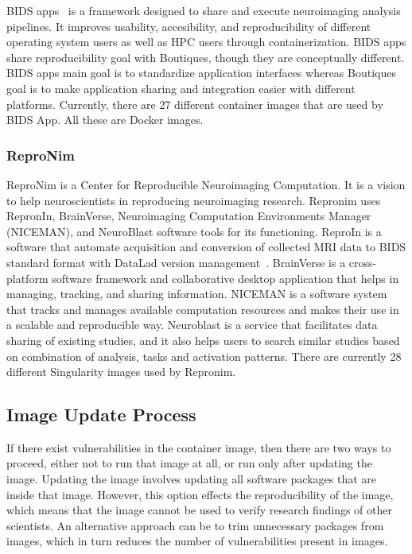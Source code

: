 \documentclass[a4paper,num-refs]{oup-contemporary}
\begin{document}
BIDS apps~\cite{gorgolewski2017bids} is a framework designed to share and execute neuroimaging
analysis pipelines. It improves usability, accesibility, and reproducibility
of different operating system users as well as HPC users through containerization.
BIDS apps share reproducibility goal with Boutiques, though they are conceptually different.
BIDS apps main goal is to standardize application interfaces whereas Boutiques goal is to
make application sharing and integration easier with different platforms.
Currently, there are 27 different container images that are used by
BIDS App. All these are Docker images.

\subsubsection{ReproNim}

ReproNim is a Center for Reproducible Neuroimaging Computation. It is a vision
to help neuroscientists in reproducing neuroimaging research. Repronim
uses RepronIn, BrainVerse, Neuroimaging Computation Environments Manager (NICEMAN),
and NeuroBlast software tools for its
functioning. ReproIn is a software that automate acquisition and conversion
of collected MRI data to BIDS standard format with DataLad version management~\cite{kennedy2019everything}.
BrainVerse is a cross-platform software framework and collaborative desktop application
that helps in managing, tracking, and sharing information.
NICEMAN is a software system that tracks and manages available computation resources
and makes their use in a scalable and reproducible way.
Neuroblast is a service that facilitates data sharing of existing studies, and it also
helps users to search similar studies based on combination of analysis,
tasks and activation patterns. There are currently 28 different Singularity
images used by Repronim. 

\subsection{Image Update Process}

If there exist vulnerabilities in the container image, then there are two ways
to proceed, either not to run that image at all, or run only after updating the
image. Updating the image involves updating all software packages that are
inside that image. However, this option effects the reproducibility
of the image, which means that the image cannot be used to verify research
findings of other scientists. An alternative approach can be to trim unnecessary
packages from images, which in turn reduces the number of vulnerabilities
present in images.
\end{document}

